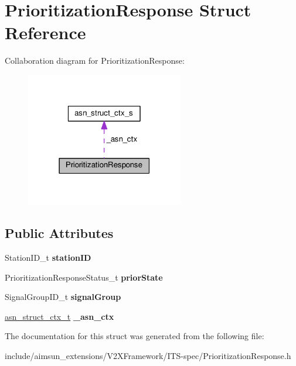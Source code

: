 \hypertarget{structPrioritizationResponse}{}\section{Prioritization\+Response Struct Reference}
\label{structPrioritizationResponse}


Collaboration diagram for Prioritization\+Response\+:\nopagebreak
\begin{figure}[H]
\begin{center}
\leavevmode
\includegraphics[width=195pt]{structPrioritizationResponse__coll__graph}
\end{center}
\end{figure}
\subsection*{Public Attributes}
\begin{DoxyCompactItemize}
\item 
Station\+I\+D\+\_\+t {\bfseries station\+ID}\hypertarget{structPrioritizationResponse_a86cea73dff257fcb2520c63b87ec21e8}{}\label{structPrioritizationResponse_a86cea73dff257fcb2520c63b87ec21e8}

\item 
Prioritization\+Response\+Status\+\_\+t {\bfseries prior\+State}\hypertarget{structPrioritizationResponse_ad1ae12560752fe930f21741bdce48a37}{}\label{structPrioritizationResponse_ad1ae12560752fe930f21741bdce48a37}

\item 
Signal\+Group\+I\+D\+\_\+t {\bfseries signal\+Group}\hypertarget{structPrioritizationResponse_a1b7104e7413e508c35ef211a531a7256}{}\label{structPrioritizationResponse_a1b7104e7413e508c35ef211a531a7256}

\item 
\hyperlink{structasn__struct__ctx__s}{asn\+\_\+struct\+\_\+ctx\+\_\+t} {\bfseries \+\_\+asn\+\_\+ctx}\hypertarget{structPrioritizationResponse_a049dd0606e3a3948bec7ef182cc5ee90}{}\label{structPrioritizationResponse_a049dd0606e3a3948bec7ef182cc5ee90}

\end{DoxyCompactItemize}


The documentation for this struct was generated from the following file\+:\begin{DoxyCompactItemize}
\item 
include/aimsun\+\_\+extensions/\+V2\+X\+Framework/\+I\+T\+S-\/spec/Prioritization\+Response.\+h\end{DoxyCompactItemize}

